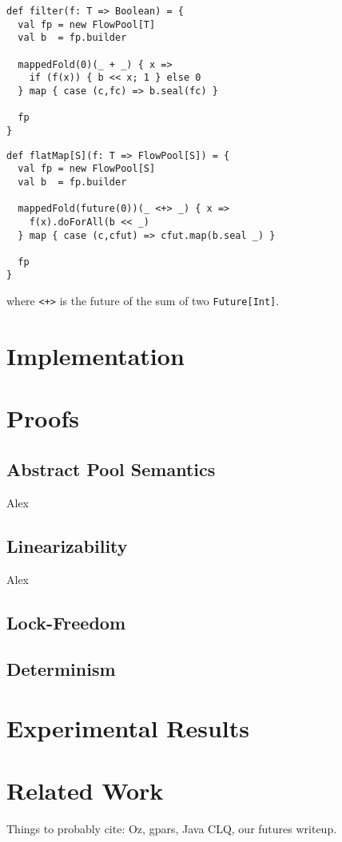 \documentclass[runningheads,a4paper]{llncs}
\begin{document}
\begin{verbatim}
def filter(f: T => Boolean) = {
  val fp = new FlowPool[T]
  val b  = fp.builder

  mappedFold(0)(_ + _) { x =>
    if (f(x)) { b << x; 1 } else 0
  } map { case (c,fc) => b.seal(fc) }

  fp
}
\end{verbatim}

\begin{verbatim}
def flatMap[S](f: T => FlowPool[S]) = {
  val fp = new FlowPool[S]
  val b  = fp.builder

  mappedFold(future(0))(_ <+> _) { x =>
    f(x).doForAll(b << _)
  } map { case (c,cfut) => cfut.map(b.seal _) }

  fp
}
\end{verbatim}
where \verb|<+>| is the future of the sum of two \verb+Future[Int]+.

\section{Implementation}

\section{Proofs}
\subsection{Abstract Pool Semantics}
Alex
\subsection{Linearizability}
Alex
\subsection{Lock-Freedom}

\subsection{Determinism}

\section{Experimental Results}

\section{Related Work}
Things to probably cite: Oz, gpars, Java CLQ, our futures writeup.
\end{document}
